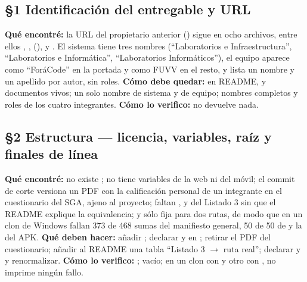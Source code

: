\subsection*{\S1 Identificaci\'on del entregable y URL}
\textbf{Qu\'e encontr\'e:} la URL del propietario anterior () sigue en ocho archivos, entre ellos , ,  (),  y . El sistema tiene tres nombres (``Laboratorios e Infraestructura'', ``Laboratorios e Inform\'atica'', ``Laboratorios Inform\'aticos''), el equipo aparece como ``For\'aCode'' en la portada y como FUVV en el resto, y  lista un nombre y un apellido por autor, sin roles. \textbf{C\'omo debe quedar:}  en README,  y documentos vivos; un solo nombre de sistema y de equipo; nombres completos y roles de los cuatro integrantes. \textbf{C\'omo lo verifico:}  no devuelve nada.

\subsection*{\S2 Estructura --- licencia, variables, ra\'iz y finales de l\'inea}
\textbf{Qu\'e encontr\'e:} no existe ;  no tiene variables de la web ni del m\'ovil; el commit de corte versiona un PDF con la calificaci\'on personal de un integrante en el cuestionario del SGA, ajeno al proyecto; faltan ,  y  del Listado 3 sin que el README explique la equivalencia; y  s\'olo fija  para dos rutas, de modo que en un clon de Windows fallan 373 de 468 sumas del manifiesto general, 50 de 50 de  y la del APK. \textbf{Qu\'e deben hacer:} a\~nadir ; declarar  y  en ; retirar el PDF del cuestionario; a\~nadir al README una tabla ``Listado 3 $\rightarrow$ ruta real''; declarar  y  y renormalizar. \textbf{C\'omo lo verifico:} ;  vac\'io; en un clon con  y otro con ,  no imprime ning\'un fallo.

